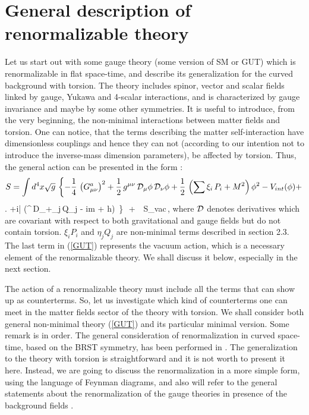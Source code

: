 \section{General description of renormalizable theory}

Let us start out with some gauge theory (some version of 
SM or GUT) which is
renormalizable in flat space-time, and describe its 
generalization for the curved background with torsion. 
The theory includes spinor, vector and scalar fields 
linked by gauge, Yukawa and 4-scalar interactions, and is 
characterized by gauge invariance and maybe by some other 
symmetries. It is useful to introduce, from the very beginning, 
the non-minimal interactions between matter fields and 
torsion. One can notice, that the terms 
describing the matter self-interaction 
have dimensionless couplings and hence they can not 
(according to our intention not to introduce the inverse-mass 
dimension parameters), be affected by torsion. Thus, the  
general action can be presented in the form \cite{bush1}:
$$
S = \int d^4x\sqrt{g}\,
\left\{ -\frac14\,\left(G_{\mu\nu}^a\right)^2 
+\frac12\,g^{\mu\nu}\,{\cal D}_\mu\phi\,{\cal D}_\nu\phi 
+\frac12\,\left(\sum \xi_i\,P_i + M^2\right) \phi^2 
- V_{int}(\phi) +
\right.
$$
\beq
\left.
+i{\bar \psi} \left(\ga^\al \,{\cal D}_\al +\sum \eta_j\,Q_j - 
im + h\phi \right)\psi \, \right\}\,\, + \,\, S_{vac}\,,
\label{GUT}
\eeq
where ${\cal D}$ denotes derivatives which are covariant 
with respect to both gravitational and gauge fields but do not 
contain torsion. $\xi_iP_i$ and $\eta_jQ_j$ are non-minimal 
terms described in section 2.3.
The last term in (\ref{GUT}) represents the 
vacuum action, which is a necessary element of the renormalizable 
theory. We shall discuss it below, especially in the next section.

The action of a renormalizable theory must include all the terms 
that can show up as counterterms. So, let us investigate 
which kind of counterterms one can meet in the matter fields 
sector of the theory with torsion. We shall consider 
both general non-minimal theory (\ref{GUT}) and its particular 
minimal version. Some remark is in order. The general 
consideration of renormalization in curved space-time, based 
on the BRST symmetry, has been performed in \cite{tmf,book}. 
The generalization to the theory with 
torsion is straightforward and it is not worth to present it 
here. Instead, we are going to discuss the renormalization 
in a more simple form, using 
the language of Feynman diagrams, and also will refer to the
general statements about the renormalization of the 
gauge theories in presence of the background fields
\cite{dewitt,aref,kallosh}.

